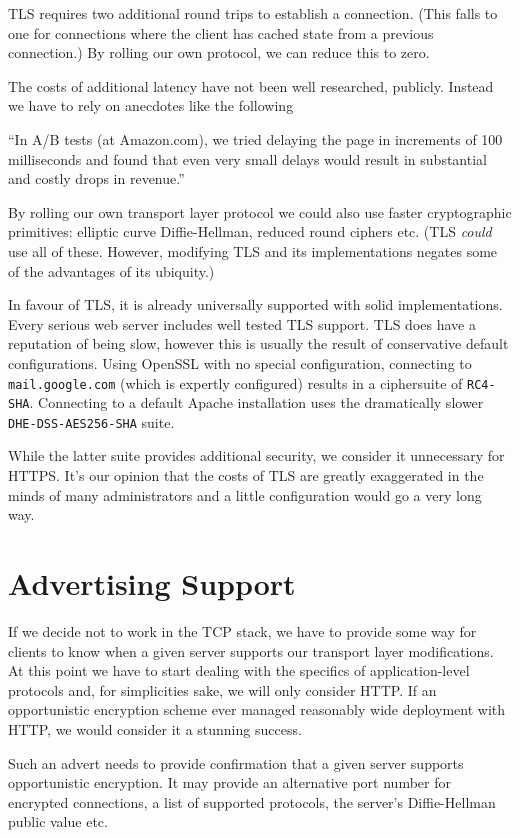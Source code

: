 \documentclass[conference]{IEEEtran}
\begin{document}
TLS requires two additional round trips to establish a connection. (This falls
to one for connections where the client has cached state from a previous
connection.) By rolling our own protocol, we can reduce this to zero.

The costs of additional latency have not been well researched, publicly.
Instead we have to rely on anecdotes like the following

  ``In A/B tests (at Amazon.com), we tried delaying the page in increments of
  100 milliseconds and found that even very small delays would result in
  substantial and costly drops in revenue.''\cite{latency}

By rolling our own transport layer protocol we could also use faster
cryptographic primitives: elliptic curve Diffie-Hellman, reduced round ciphers
etc. (TLS {\it could} use all of these. However, modifying TLS and its
implementations negates some of the advantages of its ubiquity.)

In favour of TLS, it is already universally supported with solid
implementations. Every serious web server includes well tested TLS support. TLS
does have a reputation of being slow, however this is usually the result of
conservative default configurations. Using OpenSSL with no special
configuration, connecting to {\tt mail.google.com} (which is expertly
configured) results in a ciphersuite of {\tt RC4-SHA}. Connecting to
a default Apache installation uses the dramatically slower {\tt
DHE-DSS-AES256-SHA} suite.

While the latter suite provides additional security, we consider it
unnecessary for HTTPS. It's our opinion that the costs of
TLS are greatly exaggerated in the minds of many administrators and a little
configuration would go a very long way.

\section{Advertising Support}

If we decide not to work in the TCP stack, we have to provide some way for
clients to know when a given server supports our transport layer modifications.
At this point we have to start dealing with the specifics of application-level
protocols and, for simplicities sake, we will only consider HTTP. If an
opportunistic encryption
scheme ever managed reasonably wide deployment with HTTP, we would consider it
a stunning success.

Such an advert needs to provide confirmation that a given server supports
opportunistic encryption. It may provide an alternative port number for
encrypted connections, a list of supported protocols, the server's
Diffie-Hellman public value etc.
\end{document}
